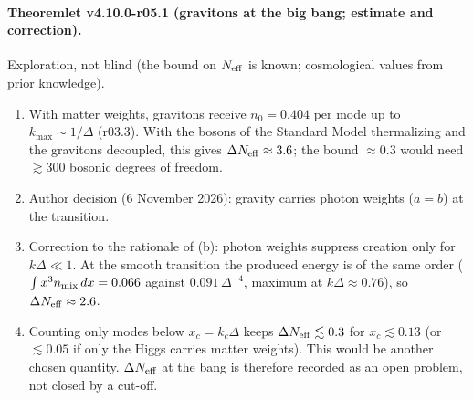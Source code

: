 \paragraph{Theoremlet v4.10.0-r05.1 (gravitons at the big bang; estimate and correction).}
Exploration, not blind (the bound on \(N_{\rm eff}\) is known; cosmological values from prior knowledge).
\begin{enumerate}[leftmargin=2em]
\item[(a)] With matter weights, gravitons receive \(n_0=0.404\) per mode up to \(k_{\max}\sim1/\Delta\) (r03.3).  With the bosons of the Standard Model
thermalizing and the gravitons decoupled, this gives \(\Delta N_{\rm eff}\approx3.6\); the bound \(\approx0.3\) would need \(\gtrsim300\) bosonic degrees of freedom.
\item[(b)] Author decision (6 November 2026): gravity carries photon weights (\(a=b\)) at the transition.
\item[(c)] Correction to the rationale of (b): photon weights suppress creation only for \(k\Delta\ll1\).  At the smooth transition the produced energy
is of the same order (\(\int x^3n_{\rm mix}\,dx=0.066\) against \(0.091\,\Delta^{-4}\), maximum at \(k\Delta\approx0.76\)), so \(\Delta N_{\rm eff}\approx2.6\).
\item[(d)] Counting only modes below \(x_c=k_c\Delta\) keeps \(\Delta N_{\rm eff}\lesssim0.3\) for \(x_c\lesssim0.13\) (or \(\lesssim0.05\) if only the Higgs carries matter
weights).  This would be another chosen quantity.  \(\Delta N_{\rm eff}\) at the bang is therefore recorded as an open problem, not closed by a cut-off.
\end{enumerate}

